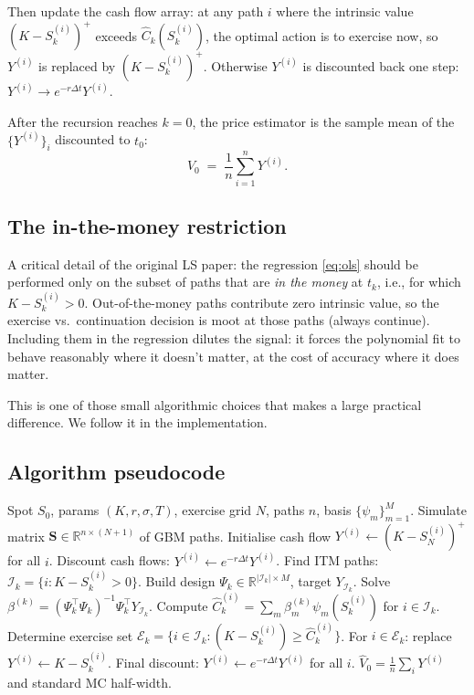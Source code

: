 \documentclass[11pt,a4paper]{article}
\theoremstyle{plain}
\theoremstyle{definition}
\theoremstyle{remark}
\newcommand{\R}{\mathbb{R}}
\begin{document}
Then update the cash flow array: at any path $i$ where the intrinsic
value $(K - S_k^{(i)})^+$ exceeds $\widehat C_k(S_k^{(i)})$, the
optimal action is to exercise now, so $Y^{(i)}$ is replaced by
$(K - S_k^{(i)})^+$. Otherwise $Y^{(i)}$ is discounted back one step:
$Y^{(i)} \to e^{-r\Delta t} Y^{(i)}$.

After the recursion reaches $k = 0$, the price estimator is the
sample mean of the $\{Y^{(i)}\}_i$ discounted to $t_0$:
\begin{equation}
\widehat V_0 \;=\; \frac{1}{n} \sum_{i=1}^n Y^{(i)}.
\label{eq:price-estimator}
\end{equation}

\subsection{The in-the-money restriction}

A critical detail of the original LS paper: the regression
\eqref{eq:ols} should be performed only on the subset of paths that
are \emph{in the money} at $t_k$, i.e., for which $K - S_k^{(i)} > 0$.
Out-of-the-money paths contribute zero intrinsic value, so the
exercise vs.\ continuation decision is moot at those paths (always
continue). Including them in the regression dilutes the signal: it
forces the polynomial fit to behave reasonably where it doesn't
matter, at the cost of accuracy where it does matter.

This is one of those small algorithmic choices that makes a large
practical difference. We follow it in the implementation.

\subsection{Algorithm pseudocode}

\begin{algorithm}[H]
\caption{Longstaff-Schwartz for the American put}
\label{alg:lsm}
\begin{algorithmic}[1]
\Require Spot $S_0$, params $(K, r, \sigma, T)$, exercise grid $N$, paths $n$, basis $\{\psi_m\}_{m=1}^M$.
\State Simulate matrix $\mathbf{S} \in \R^{n \times (N+1)}$ of GBM paths.
\State Initialise cash flow $Y^{(i)} \gets (K - S_N^{(i)})^+$ for all $i$.
  \State Discount cash flows: $Y^{(i)} \gets e^{-r\Delta t} Y^{(i)}$.
  \State Find ITM paths: $\mathcal{I}_k = \{i : K - S_k^{(i)} > 0\}$.
  \State Build design $\Psi_k \in \R^{|\mathcal{I}_k| \times M}$, target $Y_{\mathcal{I}_k}$.
  \State Solve $\beta^{(k)} = (\Psi_k^\top \Psi_k)^{-1} \Psi_k^\top Y_{\mathcal{I}_k}$.
  \State Compute $\widehat C_k^{(i)} = \sum_m \beta_m^{(k)} \psi_m(S_k^{(i)})$ for $i \in \mathcal{I}_k$.
  \State Determine exercise set $\mathcal{E}_k = \{i \in \mathcal{I}_k : (K - S_k^{(i)}) \ge \widehat C_k^{(i)}\}$.
  \State For $i \in \mathcal{E}_k$: replace $Y^{(i)} \gets K - S_k^{(i)}$.
\EndFor
\State Final discount: $Y^{(i)} \gets e^{-r\Delta t} Y^{(i)}$ for all $i$.
\State \Return $\widehat V_0 = \frac{1}{n}\sum_i Y^{(i)}$ and standard MC half-width.
\end{algorithmic}
\end{algorithm}
\end{document}
